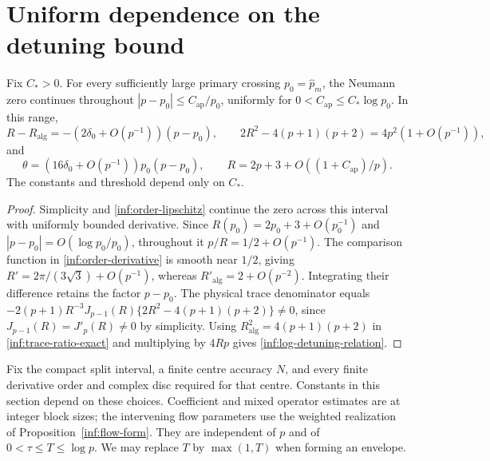 \section{Uniform dependence on the detuning bound}\label{inf:sec-tame}

\begin{lemma}
\label{inf:log-root-detuning}
Fix $C_*>0$. For every sufficiently large primary crossing
$p_0=\widehat p_m$, the Neumann zero continues throughout
$|p-p_0|\le C_{\mathrm{ap}}/p_0$, uniformly for
$0<C_{\mathrm{ap}}\le C_*\log p_0$. In this range,
\[
 R-R_{\mathrm{alg}}=-(2\delta_0+O(p^{-1}))(p-p_0),\qquad
 2R^2-4(p+1)(p+2)=4p^2(1+O(p^{-1})),
\]
and
\begin{equation}\label{inf:log-detuning-relation}
 \theta=(16\delta_0+O(p^{-1}))p_0(p-p_0),\qquad
 R=2p+3+O((1+C_{\mathrm{ap}})/p).
\end{equation}
The constants and threshold depend only on $C_*$.
\end{lemma}
\begin{proof}
Simplicity and \eqref{inf:order-lipschitz} continue the zero across
this interval with uniformly bounded derivative. Since
$R(p_0)=2p_0+3+O(p_0^{-1})$ and
$|p-p_0|=O(\log p_0/p_0)$, throughout it
$p/R=1/2+O(p^{-1})$. The comparison function in
\eqref{inf:order-derivative} is smooth near $1/2$, giving
$R'=2\pi/(3\sqrt3)+O(p^{-1})$, whereas
$R'_{\mathrm{alg}}=2+O(p^{-2})$.
Integrating their difference retains the factor $p-p_0$.
The physical trace denominator equals
$-2(p+1)R^{-3}J_{p-1}(R)\{2R^2-4(p+1)(p+2)\}\ne0$,
since $J_{p-1}(R)=J'_p(R)\ne0$ by simplicity.
Using $R_{\mathrm{alg}}^2=4(p+1)(p+2)$ in
\eqref{inf:trace-ratio-exact} and multiplying by $4Rp$ gives
\eqref{inf:log-detuning-relation}.
\end{proof}

Fix the compact split interval, a finite centre accuracy $N$, and
every finite derivative order and complex disc required for that
centre. Constants in this section depend on these choices.
Coefficient and mixed operator estimates are at integer block sizes;
the intervening flow parameters use the weighted realization of
Proposition~\ref{inf:flow-form}.
They are independent of $p$ and of $0<\tau\le T\le\log p$.
We may replace $T$ by $\max(1,T)$ when forming an envelope.


